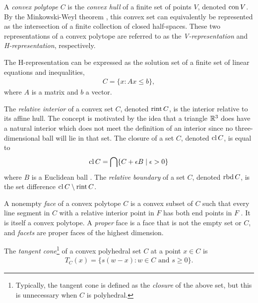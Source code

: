 A \emph{convex polytope} $C$ is the \emph{convex hull} of a finite set of points $V$, denoted $\operatorname{con} V$.
By the Minkowski-Weyl theorem \citep[Theorem 19.1]{Rockafellar:1970}, this convex 
set can equivalently be represented as the intersection of a finite collection of 
closed half-spaces.  These two representations of a convex polytope are referred to 
as the \emph{V-representation} and \emph{H-representation}, respectively.  

The H-representation can be expressed as the solution set of a finite set of linear 
equations and inequalities,
\begin{align*}
	C = \{x: Ax \leq b \},
\end{align*}
where $A$ is a matrix and $b$ a vector.

The \emph{relative interior} of a convex set $C$, denoted $\operatorname{rint} C$, is the interior 
relative to its affine hull.  The concept is motivated by the idea that a triangle
${\mathbb R}^3$ does have a natural interior which does not meet the definition of an interior
since no three-dimensional ball will lie in that set.  The closure of a set $C$, denoted $\operatorname{cl} C$, is equal to
\begin{align*}
	\operatorname{cl} C = \bigcap \{C + \epsilon B \mid \epsilon > 0 \}
\end{align*}
where $B$ is a Euclidean ball \citep{Rockafellar:1970}.  The \emph{relative boundary} of a set $C$, denoted $\operatorname{rbd} C$, is the set difference $\operatorname{cl} C \setminus \operatorname{rint} C$.

A nonempty \emph{face} of a convex polytope $C$ is a convex subset of $C$ such that 
every line segment in $C$ with a relative interior point in $F$ has both end points in 
$F$ \citep{Rockafellar:1970}.  It is itself a convex polytope.
A \emph{proper} face is a face that is not the empty set or $C$, and 
\emph{facets} are proper faces of the highest dimension.

The \emph{tangent cone}\footnote{Typically, the tangent cone is defined 
as the \emph{closure} of the above set, but
this is unnecessary when $C$ is polyhedral.}
 of a convex polyhedral set $C$ at a point $x \in C$ is
\begin{align*}
	T_C(x) = \{s(w-x):w \in C \text{ and } s \geq 0 \}.
\end{align*}


